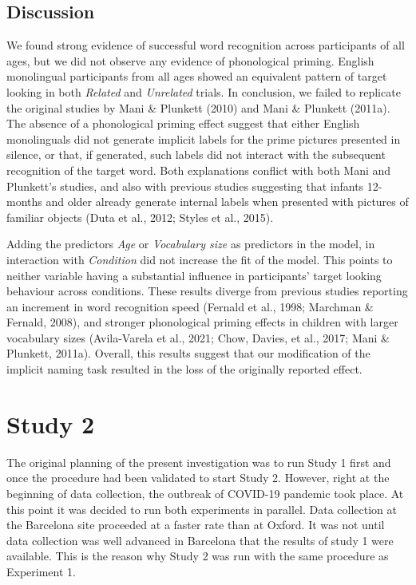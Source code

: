 \documentclass[
  12pt,
  b5paperpaper,
  twoside]{scrreprt}
\begin{document}
\hypertarget{discussion}{%
\subsection{Discussion}\label{discussion}}

We found strong evidence of successful word recognition across
participants of all ages, but we did not observe any evidence of
phonological priming. English monolingual participants from all ages
showed an equivalent pattern of target looking in both \emph{Related}
and \emph{Unrelated} trials. In conclusion, we failed to replicate the
original studies by Mani \& Plunkett (2010) and Mani \& Plunkett
(2011a). The absence of a phonological priming effect suggest that
either English monolinguals did not generate implicit labels for the
prime pictures presented in silence, or that, if generated, such labels
did not interact with the subsequent recognition of the target word.
Both explanations conflict with both Mani and Plunkett's studies, and
also with previous studies suggesting that infants 12-months and older
already generate internal labels when presented with pictures of
familiar objects (Duta et al., 2012; Styles et al., 2015).

Adding the predictors \emph{Age} or \emph{Vocabulary size} as predictors
in the model, in interaction with \emph{Condition} did not increase the
fit of the model. This points to neither variable having a substantial
influence in participants' target looking behaviour across conditions.
These results diverge from previous studies reporting an increment in
word recognition speed (Fernald et al., 1998; Marchman \& Fernald,
2008), and stronger phonological priming effects in children with larger
vocabulary sizes (Avila-Varela et al., 2021; Chow, Davies, et al., 2017;
Mani \& Plunkett, 2011a). Overall, this results suggest that our
modification of the implicit naming task resulted in the loss of the
originally reported effect.

\hypertarget{study-2}{%
\section{Study 2}\label{study-2}}

The original planning of the present investigation was to run Study 1
first and once the procedure had been validated to start Study 2.
However, right at the beginning of data collection, the outbreak of
COVID-19 pandemic took place. At this point it was decided to run both
experiments in parallel. Data collection at the Barcelona site proceeded
at a faster rate than at Oxford. It was not until data collection was
well advanced in Barcelona that the results of study 1 were available.
This is the reason why Study 2 was run with the same procedure as
Experiment 1.
\end{document}
